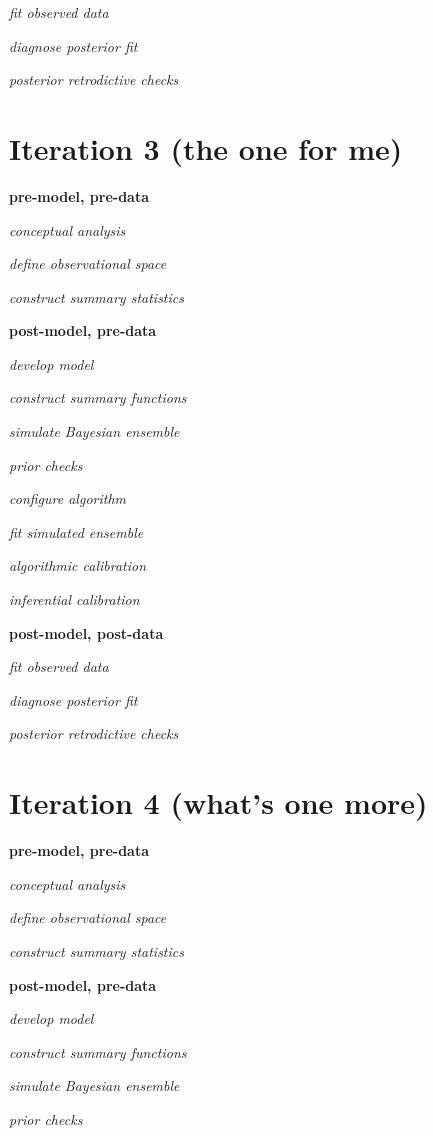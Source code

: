 \documentclass[11pt, oneside, openany]{scrbook}
\begin{document}
\emph{fit observed data}

\emph{diagnose posterior fit}

\emph{posterior retrodictive checks}

\hypertarget{iter3}{%
\section{Iteration 3 (the one for me)}\label{iter3}}

\textbf{pre-model, pre-data}

\emph{conceptual analysis}

\emph{define observational space}

\emph{construct summary statistics}

\textbf{post-model, pre-data}

\emph{develop model}

\emph{construct summary functions}

\emph{simulate Bayesian ensemble}

\emph{prior checks}

\emph{configure algorithm}

\emph{fit simulated ensemble}

\emph{algorithmic calibration}

\emph{inferential calibration}

\textbf{post-model, post-data}

\emph{fit observed data}

\emph{diagnose posterior fit}

\emph{posterior retrodictive checks}

\hypertarget{iter4}{%
\section{Iteration 4 (what's one more)}\label{iter4}}

\textbf{pre-model, pre-data}

\emph{conceptual analysis}

\emph{define observational space}

\emph{construct summary statistics}

\textbf{post-model, pre-data}

\emph{develop model}

\emph{construct summary functions}

\emph{simulate Bayesian ensemble}

\emph{prior checks}
\end{document}
